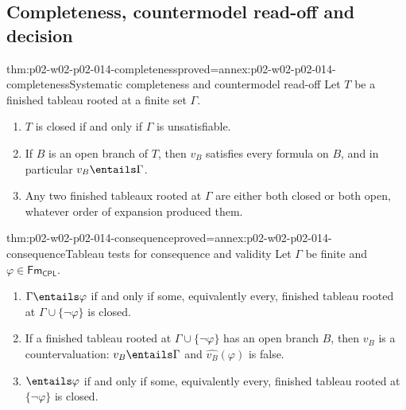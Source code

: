 \subsection{Completeness, countermodel read-off and decision}
\label{sec:p02-w02-p02-014-completeness}

\begin{hbtheorem}{thm:p02-w02-p02-014-completeness}{proved=annex:p02-w02-p02-014-completeness}{Systematic completeness and countermodel read-off}
Let \(T\) be a finished tableau rooted at a finite set \(\Gamma\).
\begin{enumerate}
  \item \(T\) is closed if and only if \(\Gamma\) is unsatisfiable.
  \item If \(B\) is an open branch of \(T\), then \(v_B\) satisfies every
        formula on \(B\), and in particular \(v_B\entails\Gamma\).
  \item Any two finished tableaux rooted at \(\Gamma\) are either both closed
        or both open, whatever order of expansion produced them.
\end{enumerate}
\end{hbtheorem}

\begin{hbcorollary}{thm:p02-w02-p02-014-consequence}{proved=annex:p02-w02-p02-014-consequence}{Tableau tests for consequence and validity}
Let \(\Gamma\) be finite and \(\varphi\in\mathsf{Fm}_{\mathsf{CPL}}\).
\begin{enumerate}
  \item \(\Gamma\entails\varphi\) if and only if some, equivalently every,
        finished tableau rooted at \(\Gamma\cup\{\neg\varphi\}\) is closed.
  \item If a finished tableau rooted at \(\Gamma\cup\{\neg\varphi\}\) has an
        open branch \(B\), then \(v_B\) is a countervaluation:
        \(v_B\entails\Gamma\) and \(\widehat{v_B}(\varphi)\) is false.
  \item \(\entails\varphi\) if and only if some, equivalently every,
        finished tableau rooted at \(\{\neg\varphi\}\) is closed.
\end{enumerate}
\end{hbcorollary}

